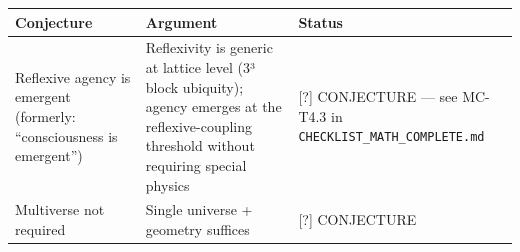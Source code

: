\documentclass[
  11pt,
  letterpaper,
  twoside,
  openany]{book}
\begin{document}
\begin{longtable}[]{@{}
  >{\raggedright\arraybackslash}p{}
  >{\raggedright\arraybackslash}p{}
  >{\raggedright\arraybackslash}p{}@{}}
\toprule\noalign{}
\begin{minipage}[b]{\linewidth}\raggedright
Conjecture
\end{minipage} & \begin{minipage}[b]{\linewidth}\raggedright
Argument
\end{minipage} & \begin{minipage}[b]{\linewidth}\raggedright
Status
\end{minipage} \\
\midrule\noalign{}
\endhead
\bottomrule\noalign{}
\endlastfoot
Reflexive agency is emergent (formerly: ``consciousness is emergent'') &
Reflexivity is generic at lattice level (3³ block ubiquity); agency
emerges at the reflexive-coupling threshold without requiring special
physics & {[}?{]} CONJECTURE --- see MC-T4.3 in
\texttt{CHECKLIST\_MATH\_COMPLETE.md} \\
Multiverse not required & Single universe + geometry suffices & {[}?{]}
CONJECTURE \\
\end{longtable}
\end{document}
